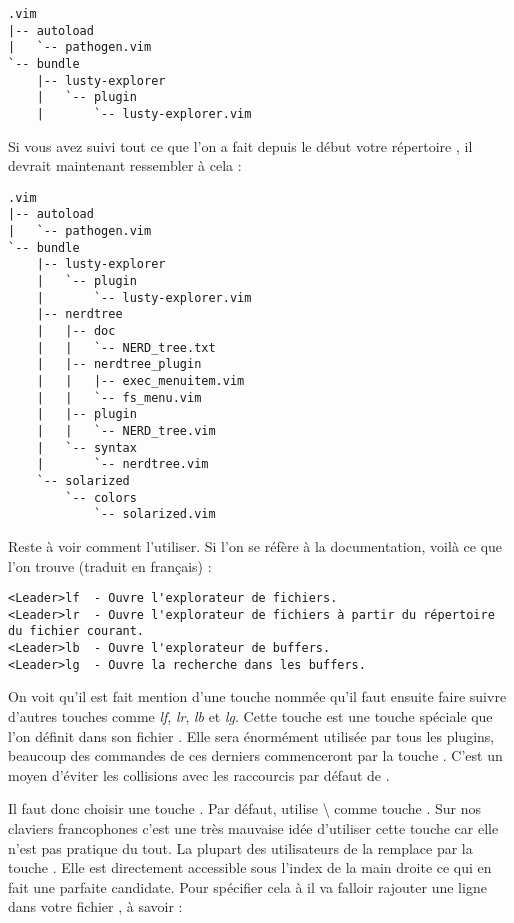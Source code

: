 \begin{verbatim}
.vim
|-- autoload
|   `-- pathogen.vim
`-- bundle
    |-- lusty-explorer
    |   `-- plugin
    |       `-- lusty-explorer.vim
\end{verbatim}

Si vous avez suivi tout ce que l'on a fait depuis le début votre répertoire \dotvim, il devrait maintenant ressembler à cela :

\begin{verbatim}
.vim
|-- autoload
|   `-- pathogen.vim
`-- bundle
    |-- lusty-explorer
    |   `-- plugin
    |       `-- lusty-explorer.vim
    |-- nerdtree
    |   |-- doc
    |   |   `-- NERD_tree.txt
    |   |-- nerdtree_plugin
    |   |   |-- exec_menuitem.vim
    |   |   `-- fs_menu.vim
    |   |-- plugin
    |   |   `-- NERD_tree.vim
    |   `-- syntax
    |       `-- nerdtree.vim
    `-- solarized
        `-- colors
            `-- solarized.vim
\end{verbatim}

Reste à voir comment l'utiliser. Si l'on se réfère à la documentation, voilà ce que l'on trouve (traduit en français) :

\begin{verbatim}
<Leader>lf  - Ouvre l'explorateur de fichiers.
<Leader>lr  - Ouvre l'explorateur de fichiers à partir du répertoire du fichier courant.
<Leader>lb  - Ouvre l'explorateur de buffers.
<Leader>lg  - Ouvre la recherche dans les buffers.
\end{verbatim}

On voit qu'il est fait mention d'une touche nommée \tleader qu'il faut ensuite faire suivre d'autres touches comme \emph{lf}, \emph{lr}, \emph{lb} et \emph{lg}. Cette touche \tleader est une touche spéciale que l'on définit dans son fichier \vimrc. Elle sera énormément utilisée par tous les plugins, beaucoup des commandes de ces derniers commenceront par la touche \tleader. C'est un moyen d'éviter les collisions avec les raccourcis par défaut de \vim.

Il faut donc choisir une touche \tleader. Par défaut, \vim utilise \textbackslash\xspace comme touche \tleader. Sur nos claviers francophones c'est une très mauvaise idée d'utiliser cette touche car elle n'est pas pratique du tout. La plupart des utilisateurs de \vim la remplace par la touche \tcomma. Elle est directement accessible sous l'index de la main droite ce qui en fait une parfaite candidate. Pour spécifier cela à \vim il va falloir rajouter une ligne dans votre fichier \vimrc, à savoir :

